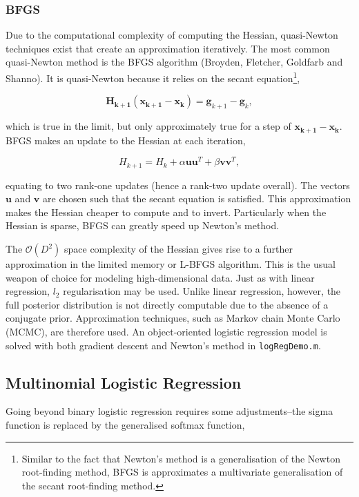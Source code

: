 \documentclass[11pt]{amsart}
\begin{document}
\subsubsection{BFGS}

Due to the computational complexity of computing the Hessian, quasi-Newton techniques exist that create an approximation iteratively. The most common quasi-Newton method is the BFGS algorithm (Broyden, Fletcher, Goldfarb and Shanno). It is quasi-Newton because it relies on the secant equation\footnote{Similar to the fact that Newton's method is a generalisation of the Newton root-finding method, BFGS is approximates a multivariate generalisation of the secant root-finding method.},

\[
\mathbf{H_{k+1}}(\mathbf{x_{k+1}} - \mathbf{x_k}) = \mathbf{g}_{k+1} - \mathbf{g}_k,
\]

which is true in the limit, but only approximately true for a step of $\mathbf{x_{k+1}} - \mathbf{x_k}$. BFGS makes an update to the Hessian at each iteration,

$$H_{k+1} = H_k + \alpha\mathbf{u}\mathbf{u}^T + \beta\mathbf{v}\mathbf{v}^T,$$

equating to two rank-one updates (hence a rank-two update overall). The vectors $\mathbf{u}$ and $\mathbf{v}$ are chosen such that the secant equation is satisfied. This approximation makes the Hessian cheaper to compute and to invert. Particularly when the Hessian is sparse, BFGS can greatly speed up Newton's method.

The $\mathcal{O}(D^2)$ space complexity of the Hessian gives rise to a further approximation in the limited memory or L-BFGS algorithm. This is the usual weapon of choice for modeling high-dimensional data. Just as with linear regression, $l_2$ regularisation may be used. Unlike linear regression, however, the full posterior distribution is not directly computable due to the absence of a conjugate prior. Approximation techniques, such as Markov chain Monte Carlo (MCMC), are therefore used. An object-oriented logistic regression model is solved with both gradient descent and Newton's method in \texttt{logRegDemo.m}.

\subsection{Multinomial Logistic Regression}

Going beyond binary logistic regression requires some adjustments--the sigma function is replaced by the generalised softmax function,
\end{document}
